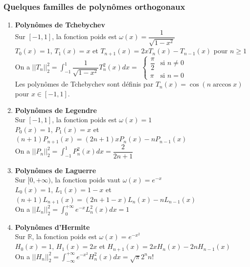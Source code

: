 \subsubsection*{Quelques familles de polynômes orthogonaux}
\begin{enumerate}
	\item [$\star$] \textbf{Polynômes de Tchebychev} \\
	Sur $[-1,1]$, la fonction poids est $\omega(x)=\dfrac{1}{\sqrt{1-x^2}}$ \\
	$T_0(x)=1$, $T_1(x)=x$ et $T_{n+1}(x)=2xT_n(x)-T_{n-1}(x)$ pour $n\geq 1$ \\
	On a $||T_n||_2^2=\displaystyle\int_{-1}^{1}\dfrac{1}{\sqrt{1-x^2}}T_n^2(x)dx=$
	$\left\lbrace \begin{array}{ll}
	\dfrac{\pi}{2} & \text{si } n \neq 0 \\
	\pi & \text{si } n = 0
	\end{array}\right. $ \\
	Les polynômes de Tchebychev sont définis par $T_n(x) = \cos(n \arccos x)$ pour $x \in [-1, 1]$.
	
	\item [$\star$] \textbf{Polynômes de Legendre} \\
	Sur $[-1,1]$, la fonction poids est $\omega(x)=1$ \\
	$P_0(x)=1$, $P_1(x)=x$ et $(n+1)P_{n+1}(x)=(2n+1)xP_n(x)-nP_{n-1}(x)$ \\
	On a $||P_n||_2^2=\displaystyle\int_{-1}^{1}P_n^2(x)dx=\dfrac{2}{2n+1}$ \\
	
	\item [$\star$] \textbf{Polynômes de Laguerre} \\
	Sur $[0,+\infty)$, la fonction poids vaut $\omega(x)=e^{-x}$ \\
	$L_0(x)=1$, $L_1(x)=1-x$ et $(n+1)L_{n+1}(x)=(2n+1-x)L_n(x)-nL_{n-1}(x)$ \\
	On a $||L_n||_2^2=\displaystyle\int_{0}^{+\infty}e^{-x}L_n^2(x)dx=1$ \\
	
	\item [$\star$] \textbf{Polynômes d'Hermite} \\
	Sur $\mathbb{R}$, la fonction poids est $\omega(x)=e^{-x^2}$ \\
	$H_0(x)=1$, $H_1(x)=2x$ et $H_{n+1}(x)=2xH_n(x)-2nH_{n-1}(x)$ \\
	On a $||H_n||_2^2=\displaystyle\int_{-\infty}^{+\infty}e^{-x^2}H_n^2(x)dx=\sqrt{\pi}2^nn!$
\end{enumerate}

